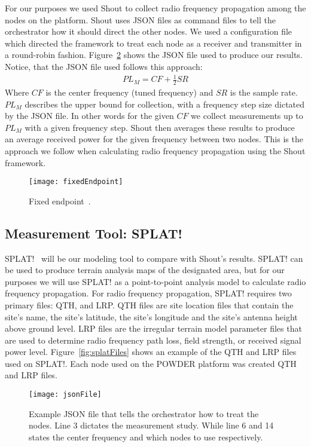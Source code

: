 For our purposes we used Shout to collect radio frequency propagation among the nodes on the platform. Shout uses JSON files as 
command files to tell the orchestrator how it should direct the other nodes. We used a configuration file which directed the framework 
to treat each node as a receiver and transmitter in a round-robin fashion. Figure~\ref{fig:allmeaspaths} shows the JSON file used to 
produce our results. Notice, that the JSON file used follows this approach:
\begin{align}
PL_M = CF + \frac{1}{2}SR
\end{align}
Where $CF$ is the center frequency (tuned frequency) and $SR$ is the sample rate. $PL_M$ describes the upper bound for collection, with 
a frequency step size dictated by the JSON file. In other words for the given $CF$ we collect measurements up to $PL_M$ with a given 
frequency step. Shout then averages these results to produce an average received power for the given frequency between two nodes. This is the 
approach we follow when calculating radio frequency propagation using the Shout framework.

\begin{figure}
  \centering
  \texttt{[image: fixedEndpoint]}
  \caption{Fixed endpoint~\cite{Breen+:wintech20}.}
  \label{fig:endpoints}
\end{figure}

\subsection*{Measurement Tool: SPLAT! }
SPLAT!~\cite{splat} will be our modeling tool to compare with Shout's results. SPLAT! can be used to produce terrain analysis maps of the 
designated area, but for our purposes we will use SPLAT! as a point-to-point analysis model to calculate radio frequency propagation. For radio
frequency propagation, SPLAT! requires two primary files: QTH, and LRP. QTH files are site location files that contain the site's name,
the site's latitude, the site's longitude and the site's antenna height above ground level. LRP files are the irregular terrain model parameter
files that are used to determine radio frequency path loss, field strength, or received signal power level. Figure~\ref{fig:splatFiles} shows an
example of the QTH and LRP files used on SPLAT!. Each node used on the POWDER platform was created QTH and LRP files. 

\begin{figure}
  \centering
  \texttt{[image: jsonFile]}
  \caption{Example JSON file that tells the orchestrator how to treat the nodes. Line 3 dictates the measurement study. While line 6 and
  14 states the center frequency and which nodes to use respectively.}
  \label{fig:allmeaspaths}
\end{figure}

